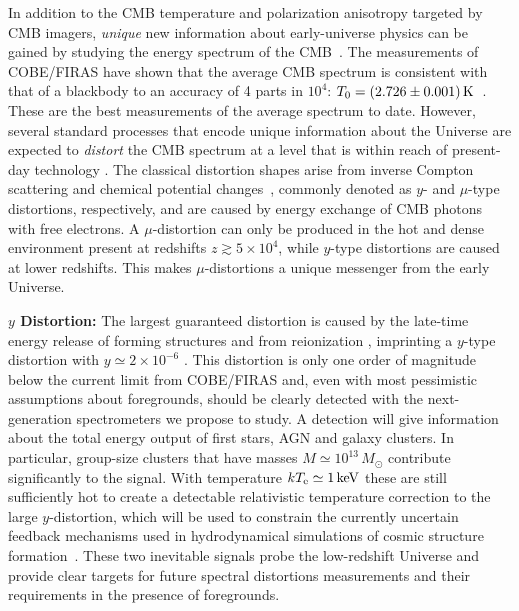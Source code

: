 In addition to the CMB temperature and polarization anisotropy targeted by CMB imagers, {\it unique} new information about 
early-universe physics can be gained by studying the energy spectrum of the 
CMB~\citep{Sunyaev1970SPEC, Burigana1993, Hu1993, Chluba2011therm}. The measurements of COBE/FIRAS have shown that 
the average CMB spectrum is consistent with that of a blackbody to an accuracy of 4 parts in $10^{4}$: 
$T_0=(2.726\pm 0.001)\,{\rm K}$~\citep{Mather1994, Fixsen1996}. These are the best measurements
of the average spectrum to date. However, several standard processes that encode 
unique information about the Universe are expected to {\it distort} 
the CMB spectrum \citep[e.g.,][]{Chluba2016LCDM} at a level that is within reach of present-day technology \citep{Kogut2011PIXIE, PRISM2013WPII}. 
%
The classical distortion shapes arise from inverse Compton scattering and chemical potential changes~\citep{Zeldovich1969, Sunyaev1970mu}, 
commonly denoted as $y$- and $\mu$-type distortions, respectively, and are caused by energy exchange of CMB photons with free electrons. 
A $\mu$-distortion can only be produced in the hot and dense environment present at redshifts $z\gtrsim 5\times10^4$, while $y$-type 
distortions are caused at lower redshifts. This makes $\mu$-distortions a unique messenger from the early Universe. 

{\bf $y$ Distortion:} The largest guaranteed distortion is caused by the late-time energy release of forming structures and 
from reionization \citep{Sunyaev1972b, Hu1994pert, Oh2003, Cen1999, Refregier2000}, imprinting a $y$-type distortion 
with $y \simeq 2\times 10^{-6}$ \citep[e.g.,][]{Refregier2000, Hill2015}. This distortion is only one order of magnitude below the current limit 
from COBE/FIRAS and, even with most pessimistic assumptions about foregrounds, should be clearly detected with the next-generation 
spectrometers we propose to study. A detection will give information about the total energy output of first stars, AGN and galaxy clusters. 
In particular, group-size clusters that have masses $M\simeq 10^{13}\,M_{\odot}$ contribute significantly to the signal. 
With temperature $k T_{\rm e}\simeq 1\,{\rm keV}$ these are still sufficiently 
hot to create a detectable relativistic temperature correction to the large $y$-distortion, 
which will be used to constrain the currently uncertain feedback mechanisms used in hydrodynamical simulations
of cosmic structure formation~\citep{Hill2015}. These two inevitable signals probe the low-redshift 
Universe and provide clear targets for future spectral distortions measurements and their requirements in the presence of foregrounds.


